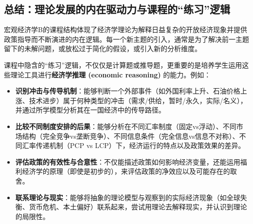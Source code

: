 \documentclass[12pt]{article}
\begin{document}
\subsection*{总结：理论发展的内在驱动力与课程的“练习”逻辑}

宏观经济学B的课程结构体现了经济学理论为解释日益复杂的开放经济现象并提供政策指导而不断演进的内在逻辑。每一个新主题的引入，通常是为了解决前一主题留下的未解问题，或放松过于简化的假设，或引入新的分析维度。

课程中隐含的“练习”逻辑，不仅仅是计算题或推导题，更重要的是培养学生运用这些理论工具进行\textbf{经济学推理 (economic reasoning)} 的能力。例如：

\begin{itemize}
    \item \textbf{识别冲击与传导机制}：能够判断一个外部事件（如外国利率上升、石油价格上涨、技术进步）属于何种类型的冲击（需求/供给，暂时/永久，实际/名义），并通过所学模型分析其在一国经济中的传导路径。
    \item \textbf{比较不同制度安排的后果}：能够分析在不同汇率制度（固定vs浮动）、不同市场结构（完全竞争vs垄断竞争）、不同信息条件（完全信息vs信息不对称）、不同汇率传递机制（PCP vs LCP）下，经济运行的特点以及政策效果的差异。
    \item \textbf{评估政策的有效性与合意性}：不仅能描述政策如何影响经济变量，还能运用福利经济学的原理（即使是初步的），来评估政策的净效应以及可能存在的取舍。
    \item \textbf{联系理论与现实}：能够将抽象的理论模型与观察到的实际经济现象（如全球失衡、货币危机、本土偏好）联系起来，尝试用理论去解释现实，并认识到理论的局限性。
\end{itemize}
\end{document}
